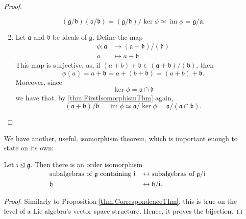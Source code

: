 \documentclass{article}
\DeclareMathOperator{\im}{im}
\newcommand*\frka{{\ensuremath{\mathfrak{a}}}}
\newcommand*\frkb{{\ensuremath{\mathfrak{b}}}}
\newcommand*\frkg{{\ensuremath{\mathfrak{g}}}}
\newcommand*\frkh{{\ensuremath{\mathfrak{h}}}}
\newcommand*\frki{{\ensuremath{\mathfrak{i}}}}
\begin{document}
\begin{proof}
\begin{enumerate}[label=(\alph*)]
            \[
                (\frkg/\frkb)(\frka/\frkb)
                =
                (\frkg/\frkb)/\ker\phi
                \simeq
                \im\phi
                =
                \frkg/\frka.
            \]
        \item 
            Let $\frka$ and $\frkb$ be ideals of $\frkg$.
            Define the map
            \begin{align*}
                \phi:
                \frka 
                &\to 
                (\frka+\frkb)/(\frkb)
                \\
                a
                &\mapsto
                a + \frkb.
            \end{align*}
            This map is surjective, as, if $(a + b) + \frkb \in (\frka+\frkb)/(\frkb)$, then
            \[
                \phi(a)
                =
                a + \frkb
                =
                a + (b + \frkb)
                =
                (a + b) + \frkb.
            \]
            Moreover, since
            \[
                \ker \phi
                =
                \frka \cap \frkb
            \]
            we have that, by \ref{thm:FirstIsomorphismThm} again,
            \[
                (\frka+\frkb)/\frkb
                =
                \im \phi
                \simeq
                \frka/\ker\phi
                =
                \frka/(\frka \cap \frkb).
            \]
    \end{enumerate}
\end{proof}

We have another, useful, isomorphism theorem, which is important enough to state on its own:

\begin{theorem}
    \label{thm:CorrespondenceThm}
    Let $\frki \trianglelefteq \frkg$.
    Then there is an order isomorphism  
    \begin{align*}
        \text{subalgebras of $\frkg$ containing $\frki$}
        &\leftrightarrow
        \text{subalgebras of $\frkg/\frki$}
        \\
        \frkh
        &\leftrightarrow
        \frkh/\frki.
    \end{align*}
\end{theorem}

\begin{proof}
    Similarly to Proposition \ref{thm:CorrespondenceThm}, this is true on the level of a Lie algebra's vector space structure.
    Hence, it proves the bijection.
\end{proof}
\end{document}
